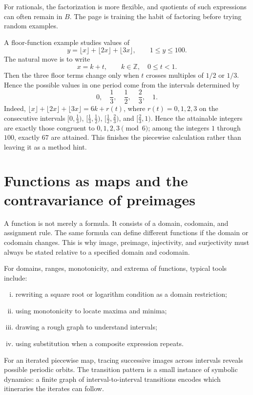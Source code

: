For rationals, the factorization is more flexible, and quotients of such expressions can often remain in \(B\).  The page is training the habit of factoring before trying random examples.

A floor-function example studies values of
\[
  y=\lfloor x\rfloor+\lfloor 2x\rfloor+\lfloor 3x\rfloor,\qquad 1\le y\le100.
\]
The natural move is to write
\[
  x=k+t,\qquad k\in\mathbb Z,\quad 0\le t<1.
\]
Then the three floor terms change only when \(t\) crosses multiples of \(1/2\) or \(1/3\).  Hence the possible values in one period come from the intervals determined by
\[
  0,\quad \frac13,\quad \frac12,\quad \frac23,\quad 1.
\]
Indeed, \(\lfloor x\rfloor+\lfloor2x\rfloor+\lfloor3x\rfloor=6k+r(t)\), where \(r(t)=0,1,2,3\) on the consecutive intervals \([0,\frac13)\), \([\frac13,\frac12)\), \([\frac12,\frac23)\), and \([\frac23,1)\). Hence the attainable integers are exactly those congruent to \(0,1,2,3\pmod6\); among the integers \(1\) through \(100\), exactly \(67\) are attained. This finishes the piecewise calculation rather than leaving it as a method hint.

\section{Functions as maps and the contravariance of preimages}

A function is not merely a formula.  It consists of a domain, codomain, and assignment rule.  The same formula can define different functions if the domain or codomain changes.  This is why image, preimage, injectivity, and surjectivity must always be stated relative to a specified domain and codomain.

For domains, ranges, monotonicity, and extrema of functions, typical tools include:
\begin{enumerate}[(i)]
  \item rewriting a square root or logarithm condition as a domain restriction;
  \item using monotonicity to locate maxima and minima;
  \item drawing a rough graph to understand intervals;
  \item using substitution when a composite expression repeats.

\end{enumerate}

For an iterated piecewise map, tracing successive images across intervals reveals possible periodic orbits. The transition pattern is a small instance of symbolic dynamics: a finite graph of interval-to-interval transitions encodes which itineraries the iterates can follow.

